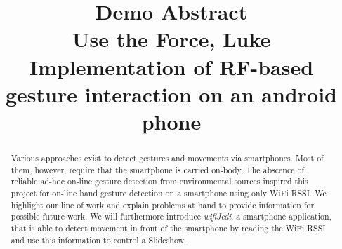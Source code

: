 \documentclass[conference]{IEEEtran}
\begin{document}
%
\title{Demo Abstract \\ Use the Force, Luke \\
{\LARGE Implementation of RF-based gesture interaction on an android phone}}
% 
\author{
{}
\and
{}
}
% 
\maketitle
% 
\begin{abstract}
Various approaches exist to detect gestures and movements via smartphones. 
Most of them, however, require that the smartphone is carried on-body.
The abscence of reliable ad-hoc on-line gesture detection from environmental sources inspired this project for on-line hand gesture detection on a smartphone using only WiFi RSSI. 
We highlight our line of work and  explain problems at hand to provide information for possible future work.
We will furthermore introduce \emph{wifiJedi}, a smartphone application, that is able to detect movement in front of the smartphone by reading the WiFi RSSI and use this information to control a Slideshow.
\end{abstract}
% 
\IEEEpeerreviewmaketitle
% 

% 
\end{document}
